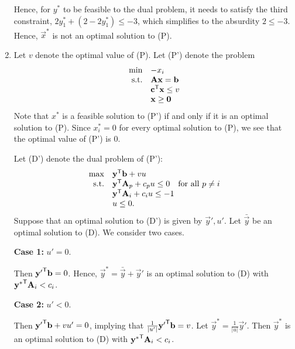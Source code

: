 \begin{enumerate}
  Hence, for \(y^*\) to be feasible to the dual problem, it needs to
  satisfy the third constraint, \(2y_1^* + (2 - 2y_1^*) \leq -3\), which
  simplifies to the absurdity \(2 \leq -3\). Hence, \(\vec{x}^*\) is not
  an optimal solution to (P).
\item
  Let \(v\) denote the optimal value of (P). Let (P') denote the problem
  \[\begin{array}{rl}
  \min & -x_i \\
  \mbox{s.t.} & \mathbf{A}\mathbf{x} = \mathbf{b} \\
  & \mathbf{c}^{\mathsf{T}} \mathbf{x} \leq v \\
  & \mathbf{x} \geq \mathbf{0}
  \end{array}\] Note that \(x^*\) is a feasible solution to (P') if and
  only if it is an optimal solution to (P). Since \(x_i^* = 0\) for
  every optimal solution to (P), we see that the optimal value of (P')
  is 0.

  Let (D') denote the dual problem of (P'): \[\begin{array}{rl}
  \max & \mathbf{y}^{\mathsf{T}} \mathbf{b} + v u \\
  \mbox{s.t.} &
  \mathbf{y}^{\mathsf{T}} \mathbf{A}_p + c_p u \leq 0~~\mbox{ for all } p \neq i \\
  & \mathbf{y}^\mathsf{T} \mathbf{A}_i + c_i u \leq -1 \\
  & u \leq 0.
  \end{array}
  \] Suppose that an optimal solution to (D') is given by
  \(\vec{y}', u'\). Let \(\bar{\vec{y}}\) be an optimal solution to (D).
  We consider two cases.

  \textbf{Case 1:} \(u' = 0\).

  Then \({\mathbf{y}'}^{\mathsf{T}}\mathbf{b} = 0\). Hence,
  \(\vec{y}^* = \bar{\vec{y}} + \vec{y}'\) is an optimal solution to (D)
  with \({\mathbf{y}^*}^{\mathsf{T}} \mathbf{A}_i < c_i\).

  \textbf{Case 2:} \(u' \lt 0\).

  Then \({\mathbf{y}'}^{\mathsf{T}}\mathbf{b} + vu'= 0\), implying that
  \(\frac{1}{|u'|} {\mathbf{y}'}^{\mathsf{T}}\mathbf{b} = v\). Let
  \(\vec{y}^* = \frac{1}{|u|}\vec{y}'\). Then \({\vec{y}^*}\) is an
  optimal solution to (D) with \({\mathbf{y}^*}^{\mathsf{T}} \mathbf{A}_i < c_i\).
\end{enumerate}
